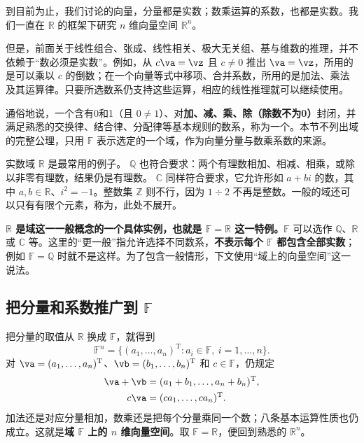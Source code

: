 \documentclass[a4paper,12pt,twoside,openany,fontset=none]{ctexbook}
\numberwithin{equation}{chapter}
\begin{document}
到目前为止，我们讨论的向量，分量都是实数；数乘运算的系数，也都是实数。我们一直在\textbf{ $\mathbb{R}$} 的框架下研究 $n$ 维向量空间 $\mathbb{R}^n$。

但是，前面关于线性组合、张成、线性相关、极大无关组、基与维数的推理，并不依赖于“数必须是实数”。例如，从 $c\va=\vz$ 且 $c\ne0$ 推出 $\va=\vz$，所用的是可以乘以 $c$ 的倒数；在一个向量等式中移项、合并系数，所用的是加法、乘法及其运算律。只要所选数系仍支持这些运算，相应的线性推理就可以继续使用。

通俗地说，一个含有0和1（且 $0\ne1$）、对\textbf{加、减、乘、除（除数不为0）}封闭，并满足熟悉的交换律、结合律、分配律等基本规则的数系，称为一个\textbf{}。本节不列出域的完整公理，只用 $\mathbb{F}$ 表示选定的一个域，作为向量分量与数乘系数的来源。

实数域 $\mathbb{R}$ 是最常用的例子。\textbf{ $\mathbb{Q}$} 也符合要求：两个有理数相加、相减、相乘，或除以非零有理数，结果仍是有理数。\textbf{ $\mathbb{C}$} 同样符合要求，它允许形如 $a+bi$ 的数，其中 $a,b\in\mathbb{R}$、$i^2=-1$。整数集 $\mathbb{Z}$ 则不行，因为 $1\div2$ 不再是整数。一般的域还可以只有有限个元素，称为，此处不展开。

\textbf{$\mathbb{R}$ 是域这一一般概念的一个具体实例，也就是 $\mathbb{F}=\mathbb{R}$ 这一特例。}$\mathbb{F}$ 可以选作 $\mathbb{Q}$、$\mathbb{R}$ 或 $\mathbb{C}$ 等。这里的“更一般”指允许选择不同数系，\textbf{不表示每个 $\mathbb{F}$ 都包含全部实数}；例如 $\mathbb{F}=\mathbb{Q}$ 时就不是这样。为了包含一般情形，下文使用“域上的向量空间”这一说法。

\subsection*{把分量和系数推广到 $\mathbb{F}$}

把分量的取值从 $\mathbb{R}$ 换成 $\mathbb{F}$，就得到
\[
    \mathbb{F}^n=\{(a_1,\ldots,a_n)^{\mathrm T}:a_i\in\mathbb{F},\ i=1,\ldots,n\}.
\]
对 $\va=(a_1,\ldots,a_n)^{\mathrm T}$、$\vb=(b_1,\ldots,b_n)^{\mathrm T}$ 和 $c\in\mathbb{F}$，仍规定
\[
\begin{aligned}
    \va+\vb&=(a_1+b_1,\ldots,a_n+b_n)^{\mathrm T},\\
    c\va&=(ca_1,\ldots,ca_n)^{\mathrm T}.
\end{aligned}
\]
加法还是对应分量相加，数乘还是把每个分量乘同一个数；八条基本运算性质也仍成立。这就是\textbf{域 $\mathbb{F}$ 上的 $n$ 维向量空间}。取 $\mathbb{F}=\mathbb{R}$，便回到熟悉的 $\mathbb{R}^n$。
\end{document}
